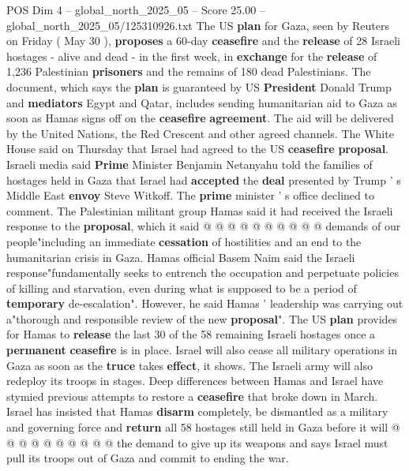 \begin{textsample}{POS Dim 4 – global\_north\_2025\_05 – Score 25.00 – global\_north\_2025\_05/125310926.txt}  \label{ex:f4_pos_196}
The US \textbf{plan} for Gaza, seen by Reuters on Friday ( May 30 ), \textbf{proposes} a 60-day \textbf{ceasefire} and the \textbf{release} of 28 Israeli hostages - alive and dead - in the first week, in \textbf{exchange} for the \textbf{release} of 1,236 Palestinian \textbf{prisoners} and the remains of 180 dead Palestinians.
The document, which says the \textbf{plan} is guaranteed by US \textbf{President} Donald Trump and \textbf{mediators} Egypt and Qatar, includes sending humanitarian aid to Gaza as soon as Hamas signs off on the \textbf{ceasefire} \textbf{agreement}.
The aid will be delivered by the United Nations, the Red Crescent and other agreed channels.
The White House said on Thursday that Israel had agreed to the US \textbf{ceasefire} \textbf{proposal}.
Israeli media said \textbf{Prime} Minister Benjamin Netanyahu told the families of hostages held in Gaza that Israel had \textbf{accepted} the \textbf{deal} presented by Trump ' s Middle East \textbf{envoy} Steve Witkoff.
The \textbf{prime} minister ' s office declined to comment.
The Palestinian militant group Hamas said it had received the Israeli response to the \textbf{proposal}, which it said @ @ @ @ @ @ @ @ @ @ demands of our people"including an immediate \textbf{cessation} of hostilities and an end to the humanitarian crisis in Gaza.
Hamas official Basem Naim said the Israeli response"fundamentally seeks to entrench the occupation and perpetuate policies of killing and starvation, even during what is supposed to be a period of \textbf{temporary} de-escalation".
However, he said Hamas ' leadership was carrying out a"thorough and responsible review of the new \textbf{proposal}".
The US \textbf{plan} provides for Hamas to \textbf{release} the last 30 of the 58 remaining Israeli hostages once a \textbf{permanent} \textbf{ceasefire} is in place.
Israel will also cease all military operations in Gaza as soon as the \textbf{truce} takes \textbf{effect}, it shows.
The Israeli army will also redeploy its troops in stages.
Deep differences between Hamas and Israel have stymied previous attempts to restore a \textbf{ceasefire} that broke down in March.
Israel has insisted that Hamas \textbf{disarm} completely, be dismantled as a military and governing force and \textbf{return} all 58 hostages still held in Gaza before it will @ @ @ @ @ @ @ @ @ @ the demand to give up its weapons and says Israel must pull its troops out of Gaza and commit to ending the war.

\end{textsample}
